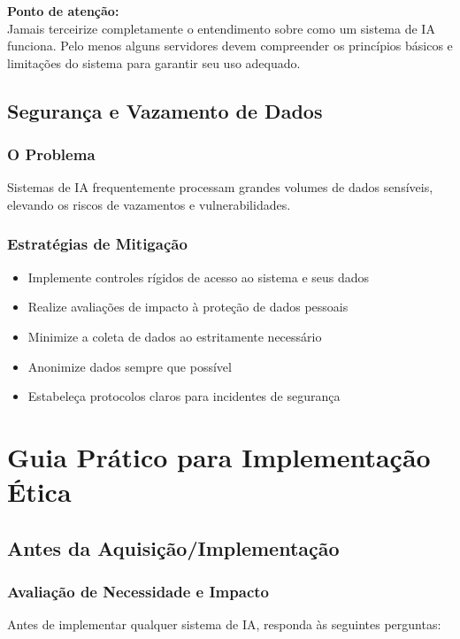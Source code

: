 \documentclass[12pt,a4paper]{article}
\begin{document}
\begin{tcolorbox}[warning]
\textbf{Ponto de atenção:} \\
Jamais terceirize completamente o entendimento sobre como um sistema de IA funciona. Pelo menos alguns servidores devem compreender os princípios básicos e limitações do sistema para garantir seu uso adequado.
\end{tcolorbox}

\subsection{Segurança e Vazamento de Dados}

\subsubsection{O Problema}
Sistemas de IA frequentemente processam grandes volumes de dados sensíveis, elevando os riscos de vazamentos e vulnerabilidades.

\subsubsection{Estratégias de Mitigação}
\begin{itemize}
    \item Implemente controles rígidos de acesso ao sistema e seus dados
    \item Realize avaliações de impacto à proteção de dados pessoais
    \item Minimize a coleta de dados ao estritamente necessário
    \item Anonimize dados sempre que possível
    \item Estabeleça protocolos claros para incidentes de segurança
\end{itemize}

\newpage
\section{Guia Prático para Implementação Ética}

\subsection{Antes da Aquisição/Implementação}

\subsubsection{Avaliação de Necessidade e Impacto}
Antes de implementar qualquer sistema de IA, responda às seguintes perguntas:
\end{document}
